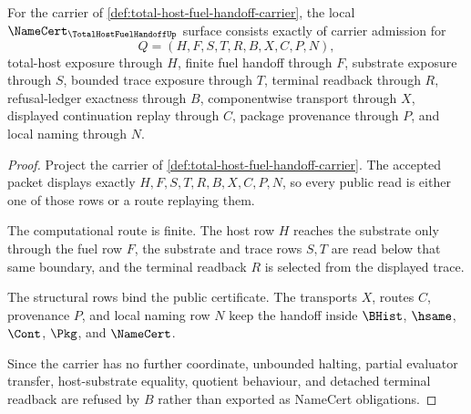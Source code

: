 \begin{theorem}
\label{thm:total-host-fuel-handoff-namecert-obligations}
For the carrier of \autoref{def:total-host-fuel-handoff-carrier}, the local $\NameCert_{\TotalHostFuelHandoffUp}$ surface consists exactly of carrier admission for
$$
Q=(H,F,S,T,R,B,X,C,P,N),
$$
total-host exposure through $H$, finite fuel handoff through $F$, substrate exposure through $S$, bounded trace exposure through $T$, terminal readback through $R$, refusal-ledger exactness through $B$, componentwise transport through $X$, displayed continuation replay through $C$, package provenance through $P$, and local naming through $N$.
\end{theorem}
\begin{proof}
Project the carrier of \autoref{def:total-host-fuel-handoff-carrier}. The accepted packet displays exactly $H,F,S,T,R,B,X,C,P,N$, so every public read is either one of those rows or a route replaying them.

The computational route is finite. The host row $H$ reaches the substrate only through the fuel row $F$, the substrate and trace rows $S,T$ are read below that same boundary, and the terminal readback $R$ is selected from the displayed trace.

The structural rows bind the public certificate. The transports $X$, routes $C$, provenance $P$, and local naming row $N$ keep the handoff inside $\BHist$, $\hsame$, $\Cont$, $\Pkg$, and $\NameCert$.

Since the carrier has no further coordinate, unbounded halting, partial evaluator transfer, host-substrate equality, quotient behaviour, and detached terminal readback are refused by $B$ rather than exported as NameCert obligations.
\end{proof}

